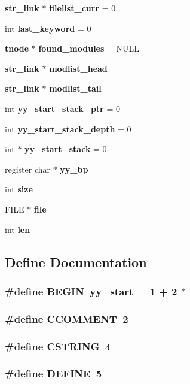 \begin{CompactItemize}
\item 
{\bf str\_\-link} $\ast$ {\bf filelist\_\-curr} = 0
\item 
int {\bf last\_\-keyword} = 0
\item 
{\bf tnode} $\ast$ {\bf found\_\-modules} = NULL
\item 
{\bf str\_\-link} $\ast$ {\bf modlist\_\-head}
\item 
{\bf str\_\-link} $\ast$ {\bf modlist\_\-tail}
\item 
int {\bf yy\_\-start\_\-stack\_\-ptr} = 0
\item 
int {\bf yy\_\-start\_\-stack\_\-depth} = 0
\item 
int $\ast$ {\bf yy\_\-start\_\-stack} = 0
\item 
register char $\ast$ {\bf yy\_\-bp}
\item 
int {\bf size}
\item 
FILE $\ast$ {\bf file}
\item 
int {\bf len}
\end{CompactItemize}


\subsection{Define Documentation}
\subsubsection{\setlength{\rightskip}{0pt plus 5cm}\#define BEGIN\ {\bf yy\_\-start} = 1 + 2 $\ast$}\label{lexer_8c_a24}


\subsubsection{\setlength{\rightskip}{0pt plus 5cm}\#define CCOMMENT\ 2}\label{lexer_8c_a59}


\subsubsection{\setlength{\rightskip}{0pt plus 5cm}\#define CSTRING\ 4}\label{lexer_8c_a61}


\subsubsection{\setlength{\rightskip}{0pt plus 5cm}\#define DEFINE\ 5}\label{lexer_8c_a62}


